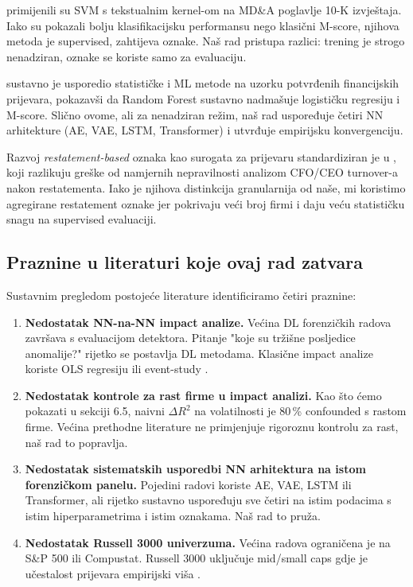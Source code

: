 \documentclass[diplomskirad,authoryear]{fer}
\begin{document}
\citet{cecchini2010} primijenili su SVM s tekstualnim kernel-om na MD\&A poglavlje 10-K izvještaja. Iako su pokazali bolju klasifikacijsku performansu nego klasični M-score, njihova metoda je supervised, zahtijeva oznake. Naš rad pristupa razlici: trening je strogo nenadziran, oznake se koriste samo za evaluaciju.

\citet{perols2011} sustavno je usporedio statističke i ML metode na uzorku potvrđenih financijskih prijevara, pokazavši da Random Forest sustavno nadmašuje logističku regresiju i M-score. Slično ovome, ali za nenadziran režim, naš rad uspoređuje četiri NN arhitekture (AE, VAE, LSTM, Transformer) i utvrđuje empirijsku konvergenciju.

Razvoj \emph{restatement-based} oznaka kao surogata za prijevaru standardiziran je u \citet{hennes2008}, koji razlikuju greške od namjernih nepravilnosti analizom CFO/CEO turnover-a nakon restatementa. Iako je njihova distinkcija granularnija od naše, mi koristimo agregirane restatement oznake jer pokrivaju veći broj firmi i daju veću statističku snagu na supervised evaluaciji.

\subsection{Praznine u literaturi koje ovaj rad zatvara}

Sustavnim pregledom postojeće literature identificiramo četiri praznine:

\begin{enumerate}
 \item \textbf{Nedostatak NN-na-NN impact analize.} Većina DL forenzičkih radova \citep{bao2020, cecchini2010, perols2011} završava s evaluacijom detektora. Pitanje "koje su tržišne posljedice anomalije?" rijetko se postavlja DL metodama. Klasične impact analize koriste OLS regresiju ili event-study \citep{mackinlay1997, fama1969}.

 \item \textbf{Nedostatak kontrole za rast firme u impact analizi.} Kao što ćemo pokazati u sekciji 6.5, naivni $\Delta R^2$ na volatilnosti je 80\,\% confounded s rastom firme. Većina prethodne literature ne primjenjuje rigoroznu kontrolu za rast, naš rad to popravlja.

 \item \textbf{Nedostatak sistematskih usporedbi NN arhitektura na istom forenzičkom panelu.} Pojedini radovi koriste AE, VAE, LSTM ili Transformer, ali rijetko sustavno uspoređuju sve četiri na istim podacima s istim hiperparametrima i istim oznakama. Naš rad to pruža.

 \item \textbf{Nedostatak Russell 3000 univerzuma.} Većina radova ograničena je na S\&P 500 ili Compustat. Russell 3000 uključuje mid/small caps gdje je učestalost prijevara empirijski viša \citep{bao2020}.
\end{enumerate}
\end{document}
